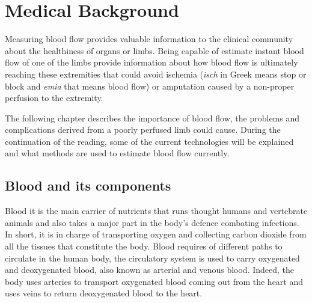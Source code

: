 
\chapter{Medical Background}
\label{chapter1}

\ifpdf
    \graphicspath{{Chapter2/Figs/Raster/}{Chapter2/Figs/PDF/}{Chapter2/Figs/}}
\else
    \graphicspath{{Chapter2/Figs/Vector/}{Chapter2/Figs/}}
\fi

Measuring blood flow provides valuable information to the clinical community about the healthiness of organs or limbs. Being capable of estimate instant blood flow of one of the limbs provide information about how blood flow is ultimately reaching these extremities that could avoid ischemia (\textit{isch} in Greek means stop or block and \textit{emia} that means blood flow) or amputation caused by a non-proper perfusion to the extremity. 

The following chapter describes the importance of blood flow, the problems and complications derived from a poorly perfused limb could cause. During the continuation of the reading, some of the current technologies will be explained and what methods are used to estimate blood flow currently.  

\section{Blood and its components} %
Blood it is the main carrier of nutrients that runs thought humans and vertebrate animals and also takes a major part in the body's defence combating infections. In short, it is in charge of transporting oxygen and collecting carbon dioxide from all the tissues that constitute the body.  Blood requires of different paths to circulate in the human body, the circulatory system is used to carry oxygenated and deoxygenated blood, also known as arterial and venous blood. Indeed, the body uses arteries to transport oxygenated blood coming out from the heart and uses veins to return deoxygenated blood to the heart.


